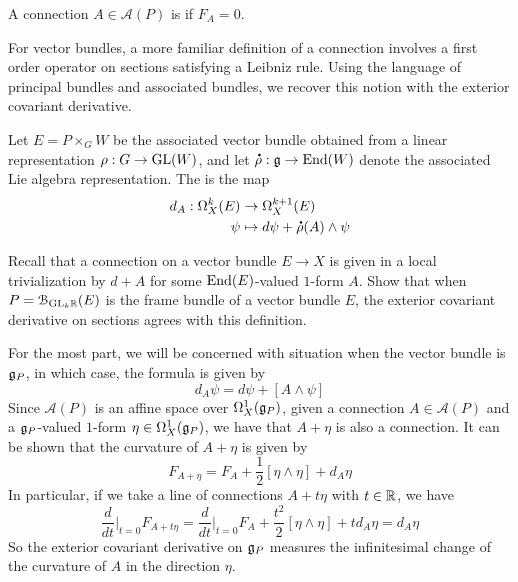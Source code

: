 %
\begin{defn}
A connection $A \in \mathscr{A}(P)$ is  if $F_A = 0$.
\end{defn}
%
For vector bundles, a more familiar definition of a connection involves
a first order operator on sections satisfying a Leibniz rule. Using
the language of principal bundles and associated bundles, we recover
this notion with the exterior covariant derivative.
%
\begin{defn}
Let $E = P\times_G W$ be the associated vector bundle obtained from a
linear representation $\rho : G \to \mathrm{GL}(W)$, and let $\accentset{\mbox{\large\bfseries .}}{\rho} : \mathfrak{g} \to \operatorname{End}(W)$
denote the associated Lie algebra representation. The 
is the map
\begin{align*}
d_A : \Omega^k_X(E) &\to \Omega^{k+1}_X(E) \\
\psi &\mapsto d\psi + \accentset{\mbox{\large\bfseries .}}{\rho}(A) \wedge \psi
\end{align*}
\end{defn}
%
\begin{exer}
Recall that a connection on a vector bundle $E \to X$ is given in a local
trivialization by $d + A$ for some $\operatorname{End}(E)$-valued $1$-form $A$.
Show that when $P = \mathcal{B}_{\mathrm{GL}_k\mathbb{R}}(E)$ is the frame bundle of a vector
bundle $E$, the exterior covariant derivative on sections agrees with
this definition.
\end{exer}
%
For the most part, we will be concerned with situation when the vector
bundle is $\mathfrak{g}_P$, in which case, the formula is given by
\[
d_A\psi = d\psi + [A\wedge\psi]
\]
Since $\mathscr{A}(P)$ is an affine space over $\Omega^1_X(\mathfrak{g}_P)$, given
a connection $A \in \mathscr{A}(P)$ and a $\mathfrak{g}_P$-valued $1$-form
$\eta \in \Omega^1_X(\mathfrak{g}_P)$, we have that $A + \eta$ is also a connection.
It can be shown that the curvature of $A+\eta$ is given by
\[
F_{A + \eta} = F_A + \frac{1}{2}[\eta\wedge\eta] + d_A\eta
\]
In particular, if we take a line of connections $A + t\eta$ with $t \in \mathbb{R}$,
we have
\[
\frac{d}{dt}\bigg\vert_{t=0}F_{A+t\eta}
= \frac{d}{dt}\bigg\vert_{t=0}F_A + \frac{t^2}{2}[\eta\wedge\eta] + td_A\eta
= d_A\eta
\]
So the exterior covariant derivative on $\mathfrak{g}_P$ measures the infinitesimal
change of the curvature of $A$ in the direction $\eta$.
%